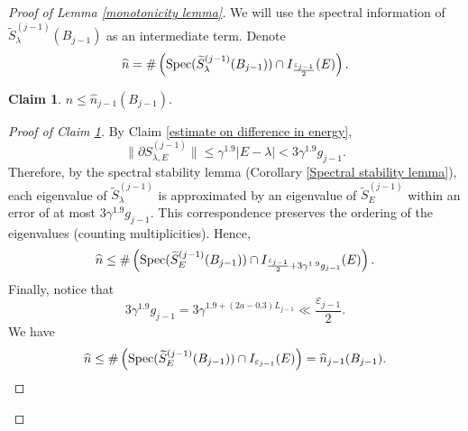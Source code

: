 \documentclass[11pt,reqno,UTF8,twoside]{amsart}
\newcommand{\spec}{{\rm Spec}}
\newcommand{\whn}{\widehat{n}}
\newcommand{\wtSjminusone}{\widetilde{S}^{(j-1)}}
\newcommand{\partialSjminusone}{\partial {S}^{(j-1)}}
\theoremstyle{definition}
\newtheorem{claim}[thm]{\bf Claim}
\numberwithin{equation}{section}
\begin{document}
\begin{proof}[Proof of Lemma \ref{monotonicity lemma}]
We will use the spectral information of $\wtSjminusone_{\lambda}(B_{j-1})$ as an  intermediate term. Denote 
\begin{equation}\label{intermediate term 1}
  \whn=\# \left(\spec(\wtSjminusone_{\lambda}(B_{j-1}))\cap I_{\frac{\varepsilon_{j-1}}{2}}(E)\right).
\end{equation}
\begin{claim}\label{intermediate comparison claim 1}
  $\whn\leq \whn_{j-1}(B_{j-1})$.
\end{claim}
\begin{proof}[Proof of Claim \ref{intermediate comparison claim 1}]
  By Claim \ref{estimate on difference in energy},
  \[\| \partialSjminusone_{\lambda,E}\|\leq \gamma^{1.9}|E-\lambda|<3  \gamma^{1.9} g_{j-1}.\]
  Therefore, by the spectral stability lemma (Corollary \ref{Spectral stability lemma}), each eigenvalue of $\wtSjminusone_{\lambda}$ is approximated  by an eigenvalue of $\wtSjminusone_{E}$ within an error of at most $3\gamma^{1.9}g_{j-1}$. This correspondence preserves the ordering of the eigenvalues (counting multiplicities). Hence,
  \[\whn\leq \# \left(\spec(\wtSjminusone_{E}(B_{j-1}))\cap I_{\frac{\varepsilon_{j-1}}{2}+3  \gamma^{1.9} g_{j-1} }(E)\right). \]
  Finally, notice that 
  \[3  \gamma^{1.9} g_{j-1} = 3  \gamma^{1.9+(2a-0.3)L_{j-1}}\ll \frac{\varepsilon_{j-1}}{2} .\]
  We have 
  \[\whn\leq \# \left(\spec(\wtSjminusone_{E}(B_{j-1}))\cap I_{\varepsilon_{j-1} }(E)\right)=\whn_{j-1}(B_{j-1}).\]
\end{proof}



\par





\end{proof}
\end{document}
